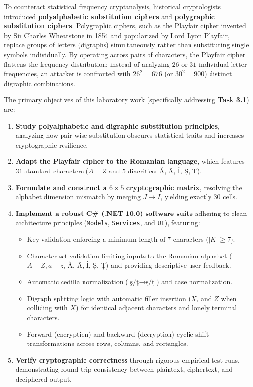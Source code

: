 \documentclass[12pt,a4paper]{article}
\begin{document}
To counteract statistical frequency cryptanalysis, historical cryptologists introduced \textbf{polyalphabetic substitution ciphers} and \textbf{polygraphic substitution ciphers}. Polygraphic ciphers, such as the Playfair cipher invented by Sir Charles Wheatstone in 1854 and popularized by Lord Lyon Playfair, replace groups of letters (digraphs) simultaneously rather than substituting single symbols individually. By operating across pairs of characters, the Playfair cipher flattens the frequency distribution: instead of analyzing $26$ or $31$ individual letter frequencies, an attacker is confronted with $26^2 = 676$ (or $30^2 = 900$) distinct digraphic combinations.

The primary objectives of this laboratory work (specifically addressing \textbf{Task 3.1}) are:
\begin{enumerate}
    \item \textbf{Study polyalphabetic and digraphic substitution principles}, analyzing how pair-wise substitution obscures statistical traits and increases cryptographic resilience.
    \item \textbf{Adapt the Playfair cipher to the Romanian language}, which features $31$ standard characters ($A-Z$ and $5$ diacritics: Ă, Â, Î, Ș, Ț).
    \item \textbf{Formulate and construct a $6 \times 5$ cryptographic matrix}, resolving the alphabet dimension mismatch by merging $J \to I$, yielding exactly $30$ cells.
    \item \textbf{Implement a robust C\# (.NET 10.0) software suite} adhering to clean architecture principles (\texttt{Models}, \texttt{Services}, and \texttt{UI}), featuring:
    \begin{itemize}
        \item Key validation enforcing a minimum length of $7$ characters ($|K| \ge 7$).
        \item Character set validation limiting inputs to the Romanian alphabet ($A-Z, a-z$, Ă, Â, Î, Ș, Ț) and providing descriptive user feedback.
        \item Automatic cedilla normalization ($\text{ş/ţ} \to \text{ș/ț}$) and case normalization.
        \item Digraph splitting logic with automatic filler insertion ($X$, and $Z$ when colliding with $X$) for identical adjacent characters and lonely terminal characters.
        \item Forward (encryption) and backward (decryption) cyclic shift transformations across rows, columns, and rectangles.
    \end{itemize}
    \item \textbf{Verify cryptographic correctness} through rigorous empirical test runs, demonstrating round-trip consistency between plaintext, ciphertext, and deciphered output.
\end{enumerate}
\end{document}
